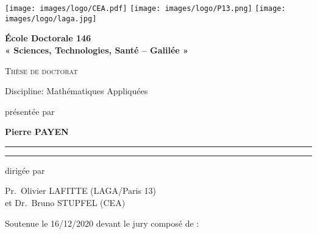 \hypersetup{pageanchor=false}
\thispagestyle{empty}
\begin{titlepage}
\texttt{[image: images/logo/CEA.pdf]}
\hfill
\texttt{[image: images/logo/P13.png]}
\hfill
\texttt{[image: images/logo/laga.jpg]}


\begin{center}
{\Large \textbf{École Doctorale 146 \\« Sciences, Technologies, Santé – Galilée »}}


{\Huge \textsc{Thèse de doctorat}}


{\LARGE Discipline: Mathématiques Appliquées}


{\large présentée par}

{
    \textbf{{\LARGE Pierre PAYEN}}\\
}

\hrule
{}
{\LARGE \textbf{\doctitlefr}}
\hrule

{
    \large dirigée par}

{
    \Large
    Pr.~Olivier LAFITTE (LAGA/Paris 13)\\
    et Dr.~Bruno STUPFEL (CEA)
}



{
    \large Soutenue le 16/12/2020 devant le jury composé de :
}
\newcommand{\mme}{M\textsuperscript{me}}


\end{center}
\end{titlepage}
